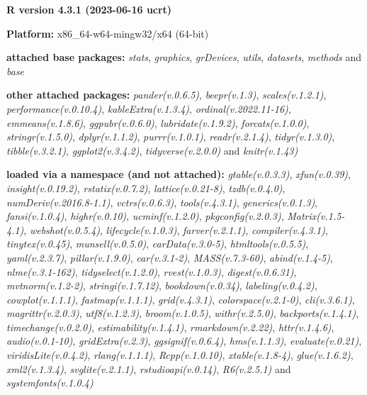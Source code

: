\documentclass[
  bookmarksnumbered]{article}
\begin{document}
\textbf{R version 4.3.1 (2023-06-16 ucrt)}

\textbf{Platform:} x86\_64-w64-mingw32/x64 (64-bit)

\textbf{attached base packages:}
\emph{stats}, \emph{graphics}, \emph{grDevices}, \emph{utils}, \emph{datasets}, \emph{methods} and \emph{base}

\textbf{other attached packages:}
\emph{pander(v.0.6.5)}, \emph{beepr(v.1.3)}, \emph{scales(v.1.2.1)}, \emph{performance(v.0.10.4)}, \emph{kableExtra(v.1.3.4)}, \emph{ordinal(v.2022.11-16)}, \emph{emmeans(v.1.8.6)}, \emph{ggpubr(v.0.6.0)}, \emph{lubridate(v.1.9.2)}, \emph{forcats(v.1.0.0)}, \emph{stringr(v.1.5.0)}, \emph{dplyr(v.1.1.2)}, \emph{purrr(v.1.0.1)}, \emph{readr(v.2.1.4)}, \emph{tidyr(v.1.3.0)}, \emph{tibble(v.3.2.1)}, \emph{ggplot2(v.3.4.2)}, \emph{tidyverse(v.2.0.0)} and \emph{knitr(v.1.43)}

\textbf{loaded via a namespace (and not attached):}
\emph{gtable(v.0.3.3)}, \emph{xfun(v.0.39)}, \emph{insight(v.0.19.2)}, \emph{rstatix(v.0.7.2)}, \emph{lattice(v.0.21-8)}, \emph{tzdb(v.0.4.0)}, \emph{numDeriv(v.2016.8-1.1)}, \emph{vctrs(v.0.6.3)}, \emph{tools(v.4.3.1)}, \emph{generics(v.0.1.3)}, \emph{fansi(v.1.0.4)}, \emph{highr(v.0.10)}, \emph{ucminf(v.1.2.0)}, \emph{pkgconfig(v.2.0.3)}, \emph{Matrix(v.1.5-4.1)}, \emph{webshot(v.0.5.4)}, \emph{lifecycle(v.1.0.3)}, \emph{farver(v.2.1.1)}, \emph{compiler(v.4.3.1)}, \emph{tinytex(v.0.45)}, \emph{munsell(v.0.5.0)}, \emph{carData(v.3.0-5)}, \emph{htmltools(v.0.5.5)}, \emph{yaml(v.2.3.7)}, \emph{pillar(v.1.9.0)}, \emph{car(v.3.1-2)}, \emph{MASS(v.7.3-60)}, \emph{abind(v.1.4-5)}, \emph{nlme(v.3.1-162)}, \emph{tidyselect(v.1.2.0)}, \emph{rvest(v.1.0.3)}, \emph{digest(v.0.6.31)}, \emph{mvtnorm(v.1.2-2)}, \emph{stringi(v.1.7.12)}, \emph{bookdown(v.0.34)}, \emph{labeling(v.0.4.2)}, \emph{cowplot(v.1.1.1)}, \emph{fastmap(v.1.1.1)}, \emph{grid(v.4.3.1)}, \emph{colorspace(v.2.1-0)}, \emph{cli(v.3.6.1)}, \emph{magrittr(v.2.0.3)}, \emph{utf8(v.1.2.3)}, \emph{broom(v.1.0.5)}, \emph{withr(v.2.5.0)}, \emph{backports(v.1.4.1)}, \emph{timechange(v.0.2.0)}, \emph{estimability(v.1.4.1)}, \emph{rmarkdown(v.2.22)}, \emph{httr(v.1.4.6)}, \emph{audio(v.0.1-10)}, \emph{gridExtra(v.2.3)}, \emph{ggsignif(v.0.6.4)}, \emph{hms(v.1.1.3)}, \emph{evaluate(v.0.21)}, \emph{viridisLite(v.0.4.2)}, \emph{rlang(v.1.1.1)}, \emph{Rcpp(v.1.0.10)}, \emph{xtable(v.1.8-4)}, \emph{glue(v.1.6.2)}, \emph{xml2(v.1.3.4)}, \emph{svglite(v.2.1.1)}, \emph{rstudioapi(v.0.14)}, \emph{R6(v.2.5.1)} and \emph{systemfonts(v.1.0.4)}

\printbibliography
\end{document}
